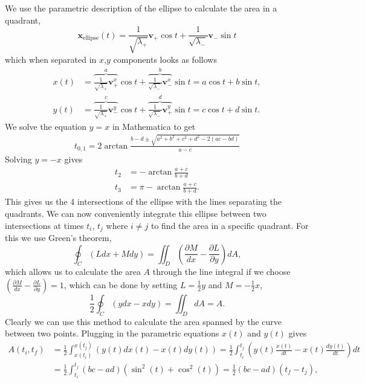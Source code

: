 \noindent We use the parametric description of the ellipse to calculate the area in a quadrant,
\begin{equation}
    \mathbf{x}_{\text{ellipse}}(t) = \frac{1}{\sqrt{\lambda_+}} \mathbf{v}_+ \cos{t} + \frac{1}{\sqrt{\lambda_-}} \mathbf{v}_- \sin{t}
    \label{eq:parametric_ellipse}
\end{equation}
which when separated in $x$,$y$ components looks as follows
\begin{align*}
    x(t) &= \overbrace{\frac{1}{\sqrt{\lambda_+}} \mathbf{v}_+^x}^{a} \cos{t} + \overbrace{\frac{1}{\sqrt{\lambda_-}} \mathbf{v}_-^x}^{b} \sin{t} = a\cos{t} + b \sin{t},\\
    y(t) &= \overbrace{\frac{1}{\sqrt{\lambda_+}} \mathbf{v}_-^y}^{c} \cos{t} + \overbrace{\frac{1}{\sqrt{\lambda_-}} \mathbf{v}_+^y}^{d} \sin{t} = c\cos{t} + d \sin{t}.
\end{align*}
We solve the equation $y=x$ in Mathematica to get
\begin{align*}
    t_{0,1} = 2 \arctan\frac{b - d \pm \sqrt{a^2 + b^2+ c^2+ d^2 - 2(ac - b d)}}{a - c}
\end{align*}
Solving $y=-x$ gives
\begin{align*}
    t_{2} &= -  \arctan\frac{a+c}{b+d}\\
    t_{3} &= \pi -  \arctan\frac{a+c}{b+d}.
\end{align*}
This gives us the 4 intersections of the ellipse with the lines separating the quadrants. We can now conveniently integrate this ellipse between two intersections at times $t_i$, $t_j$ where $i\neq j$ to find the area in a specific quadrant. For this we use Green's theorem,
\begin{equation*}
    \oint_C (L dx + Mdy) = \iint_D \left(\frac{\partial M}{dx} - \frac{\partial L}{\partial y}\right)dA,
\end{equation*}
which allows us to calculate the area $A$ through the line integral if we choose $\left(\frac{\partial M}{dx} - \frac{\partial L}{\partial y}\right) = 1$, which can be done by setting $L=\frac{1}{2}y$ and $M=-\frac{1}{2}x$,
\begin{equation*}
    \frac{1}{2}\oint_C (y dx - xdy) = \iint_D  dA = A.
\end{equation*}
Clearly we can use this method to calculate the area spanned by the curve between two points. Plugging in the parametric equations $x(t)$ and $y(t)$ gives
\begin{align*}
    A(t_i,t_f) &= \frac{1}{2}\int_{x(t_i)}^{x(t_j)} \left(y(t)dx(t) - x(t)dy(t)\right) = \frac{1}{2}\int_{t_i}^{t_j} \left(y(t)\frac{x(t)}{dt} - x(t)\frac{dy(t)}{dt}\right)dt\\
    &=\frac{1}{2}\int_{t_i}^{t_j}(bc - ad)(\sin^2(t) + \cos^2(t)) = \frac{1}{2}(bc - ad)(t_f - t_j),
\end{align*}
